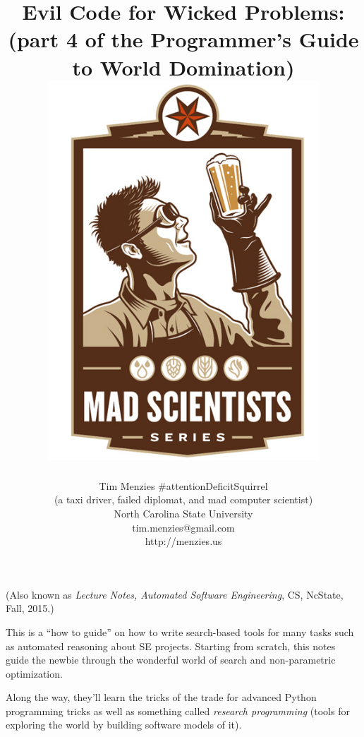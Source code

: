 \documentclass[9pt,twocolumn]{article}
\date{}
\begin{document}
 


\onecolumn
\title{{\bf Evil Code for Wicked Problems:\\
  (part 4 of the Programmer's Guide to World Domination)}\\
\vspace{5mm} \includegraphics[width=4in]{img/six.jpg}}
\author{Tim Menzies \#attentionDeficitSquirrel\\(a taxi driver, failed diplomat, and
  mad computer scientist)\\
  North Carolina State University\\tim.menzies{@}gmail.com\\http://menzies.us}

\maketitle
\begin{center}
 


(Also known as {\em Lecture Notes, Automated
  Software Engineering}, CS, NcState, Fall, 2015.)


  This is a ``how to guide'' on how to write search-based tools for many tasks such as automated
  reasoning about SE projects. Starting
  from scratch, this notes guide the newbie
  through the wonderful world of search and
  non-parametric optimization.

  Along the way,
  they'll learn the tricks of the
  trade for advanced Python programming
  tricks as well as something called {\em research programming}
  (tools for exploring the world by building software models
  of it).
  

  \end{center}
\clearpage
\twocolumn
\end{document}
